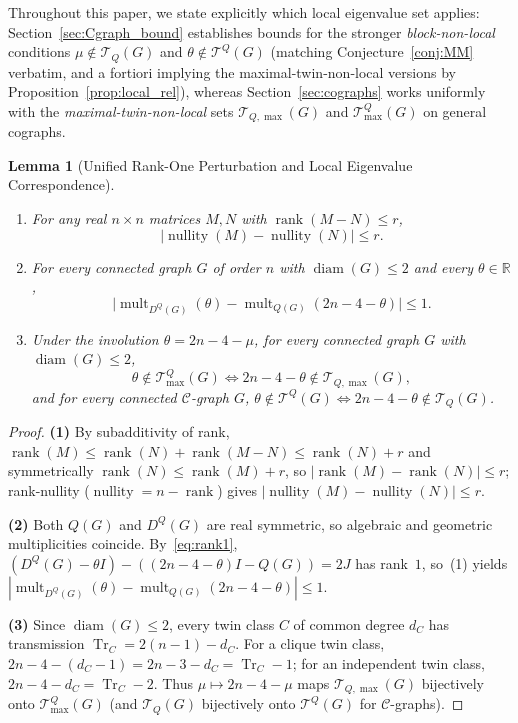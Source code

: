 \documentclass[11pt,a4paper]{article}
\newtheorem{lemma}[theorem]{Lemma}
\theoremstyle{definition}
\DeclareMathOperator{\Tr}{Tr}
\DeclareMathOperator{\mult}{mult}
\DeclareMathOperator{\diam}{diam}
\DeclareMathOperator{\rank}{rank}
\DeclareMathOperator{\nullity}{nullity}
\begin{document}
Throughout this paper, we state explicitly which local eigenvalue set applies: Section~\ref{sec:Cgraph_bound} establishes bounds for the stronger \emph{block-non-local} conditions $\mu \notin \mathcal{T}_Q(G)$ and $\theta \notin \mathcal{T}^Q(G)$ (matching Conjecture~\ref{conj:MM} verbatim, and a fortiori implying the maximal-twin-non-local versions by Proposition~\ref{prop:local_rel}), whereas Section~\ref{sec:cographs} works uniformly with the \emph{maximal-twin-non-local} sets $\mathcal{T}_{Q,\max}(G)$ and $\mathcal{T}^Q_{\max}(G)$ on general cographs.

\begin{lemma}[Unified Rank-One Perturbation and Local Eigenvalue Correspondence]\label{lem:rank1}
  \mbox{}
  \begin{enumerate}
    \item For any real $n \times n$ matrices $M, N$ with $\rank(M - N) \le r$,
    \[
      \bigl|\nullity(M) - \nullity(N)\bigr| \le r.
    \]
    \item For every connected graph $G$ of order $n$ with $\diam(G) \le 2$ and every $\theta \in \mathbb{R}$,
    \[
      \bigl|\mult_{D^Q(G)}(\theta) - \mult_{Q(G)}(2n - 4 - \theta)\bigr| \le 1.
    \]
    \item Under the involution $\theta = 2n - 4 - \mu$, for every connected graph $G$ with $\diam(G) \le 2$,
    \[
      \theta \notin \mathcal{T}^Q_{\max}(G) \iff 2n - 4 - \theta \notin \mathcal{T}_{Q,\max}(G),
    \]
    and for every connected $\mathcal{C}$-graph $G$, $\theta \notin \mathcal{T}^Q(G) \iff 2n - 4 - \theta \notin \mathcal{T}_Q(G)$.
  \end{enumerate}
\end{lemma}

\begin{proof}
  \textbf{(1)} By subadditivity of rank, $\rank(M) \le \rank(N) + \rank(M-N) \le \rank(N) + r$ and symmetrically $\rank(N) \le \rank(M) + r$, so $|\rank(M) - \rank(N)| \le r$; rank-nullity ($\nullity = n - \rank$) gives $|\nullity(M) - \nullity(N)| \le r$.

  \textbf{(2)} Both $Q(G)$ and $D^Q(G)$ are real symmetric, so algebraic and geometric multiplicities coincide. By~\eqref{eq:rank1}, $(D^Q(G) - \theta I) - ((2n-4-\theta)I - Q(G)) = 2J$ has rank~$1$, so~(1) yields $|\mult_{D^Q(G)}(\theta) - \mult_{Q(G)}(2n-4-\theta)| \le 1$.

  \textbf{(3)} Since $\diam(G) \le 2$, every twin class $C$ of common degree $d_C$ has transmission $\Tr_C = 2(n-1) - d_C$. For a clique twin class, $2n - 4 - (d_C - 1) = 2n - 3 - d_C = \Tr_C - 1$; for an independent twin class, $2n - 4 - d_C = \Tr_C - 2$. Thus $\mu \mapsto 2n - 4 - \mu$ maps $\mathcal{T}_{Q,\max}(G)$ bijectively onto $\mathcal{T}^Q_{\max}(G)$ (and $\mathcal{T}_Q(G)$ bijectively onto $\mathcal{T}^Q(G)$ for $\mathcal{C}$-graphs).
\end{proof}
\end{document}
